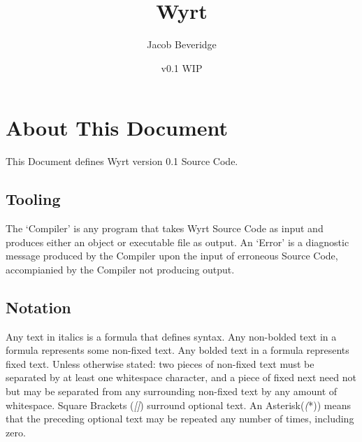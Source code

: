 \documentclass{article}
\title{Wyrt}
\author{Jacob Beveridge}
\date{v0.1 WIP}
\begin{document}
\newcommand{\ret}{$\bm{-\!\!>}$}

\maketitle
\tableofcontents
\section{About This Document}
	This Document defines Wyrt version 0.1 Source Code.
	\subsection{Tooling} The `Compiler' is any program that takes Wyrt Source Code as input and produces either an object or executable file as output. An `Error' is a diagnostic message produced by the Compiler upon the input of erroneous Source Code, accompianied by the Compiler not producing output.
	\subsection{Notation} Any text in italics is a formula that defines syntax. Any non-bolded text in a formula represents some non-fixed text. Any bolded text in a formula represents fixed text. Unless otherwise stated: two pieces of non-fixed text must be separated by at least one whitespace character, and a piece of fixed next need not but may be separated from any surrounding non-fixed text by any amount of whitespace. Square Brackets (\textit{[]}) surround optional text. An Asterisk(\textit(*)) means that the preceding optional text may be repeated any number of times, including zero.
\end{document}
